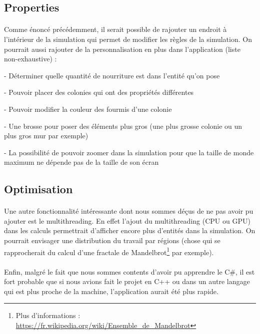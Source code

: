 \documentclass{EPUProjetDi}
\begin{document}
\subsection{Properties}
\paragraph{}
Comme énoncé précédemment, il serait possible de rajouter un endroit à l'intérieur de la simulation qui permet de modifier les règles de la simulation.
On pourrait aussi rajouter de la personnalisation en plus dans l'application (liste non-exhaustive) : 
\begin{list}{}
    \item - Déterminer quelle quantité de nourriture est dans l'entité qu'on pose
    \item - Pouvoir placer des colonies qui ont des propriétés différentes
    \item - Pouvoir modifier la couleur des fourmis d'une colonie
    \item - Une brosse pour poser des éléments plus gros (une plus grosse colonie ou un plus gros mur par exemple)
    \item - La possibilité de pouvoir zoomer dans la simulation pour que la taille de monde maximum ne dépende pas de la taille de son écran
\end{list}

\subsection{Optimisation}
\paragraph{}
Une autre fonctionnalité intéressante dont nous sommes déçus de ne pas avoir pu ajouter est le multithreading. En effet l'ajout du multithreading (CPU ou GPU) dans les calculs permettrait d'afficher 
encore plus d'entités dans la simulation. On pourrait envisager une distribution du travail par régions 
(chose qui se rapprocherait du calcul d'une fractale de Mandelbrot\footnote{Plus d'informations : \url{https://fr.wikipedia.org/wiki/Ensemble_de_Mandelbrot}} par exemple).

\paragraph{}
Enfin, malgré le fait que nous sommes contents d'avoir pu apprendre le C\#, il est fort probable que si nous avions fait le projet en C++ 
ou dans un autre langage qui est plus proche de la machine, l'application aurait été plus rapide.
\end{document}
